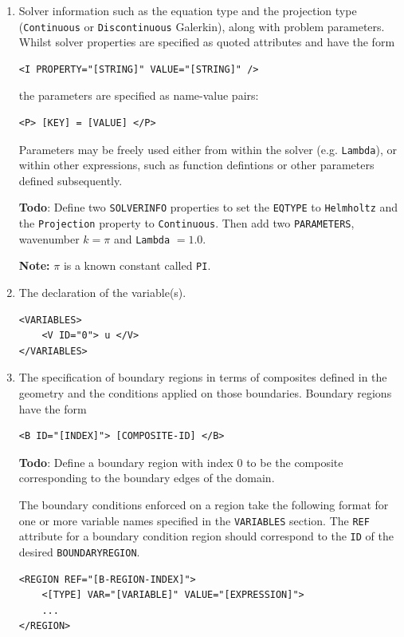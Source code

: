 \documentclass[a4paper,12pt]{article}
\begin{document}
\begin{enumerate}
\item Solver information such as the equation type and the projection type
(\texttt{Continuous} or \texttt{Discontinuous} Galerkin), along with problem
parameters. Whilst solver properties are specified as quoted
attributes and have the form
\begin{verbatim}
<I PROPERTY="[STRING]" VALUE="[STRING]" />
\end{verbatim}
the parameters are specified as name-value pairs:
\begin{verbatim}
<P> [KEY] = [VALUE] </P>
\end{verbatim}
Parameters may be freely used either from within the solver (e.g.
\texttt{Lambda}), or within other expressions, such as function defintions or
other parameters defined subsequently.

\textbf{Todo}: Define two \texttt{SOLVERINFO} properties to set the
\texttt{EQTYPE} to \texttt{Helmholtz} and the \texttt{Projection} property to
\texttt{Continuous}. Then add two \texttt{PARAMETERS}, wavenumber $k=\pi$ and
\texttt{Lambda} $=1.0$.

\smallskip
\textbf{Note: } $\pi$ is a known constant called \texttt{PI}.


\item The declaration of the variable(s).  
\begin{verbatim}
<VARIABLES>
    <V ID="0"> u </V> 
</VARIABLES>
\end{verbatim}

\item The specification of boundary regions in terms of composites defined in
the geometry and the conditions applied on those boundaries. Boundary regions
have the form
\begin{verbatim}
<B ID="[INDEX]"> [COMPOSITE-ID] </B>
\end{verbatim}

\textbf{Todo}: Define a boundary region with index 0 to be the composite
corresponding to the boundary edges of the domain. 

The boundary conditions enforced on a region take the following format for one
or more variable names specified in the \texttt{VARIABLES} section. The
\texttt{REF} attribute for a boundary condition region should correspond to the
\texttt{ID} of the desired \texttt{BOUNDARYREGION}.
\begin{verbatim}
<REGION REF="[B-REGION-INDEX]">
    <[TYPE] VAR="[VARIABLE]" VALUE="[EXPRESSION]">
    ...
</REGION>
\end{verbatim}


\end{enumerate}
\end{document}
